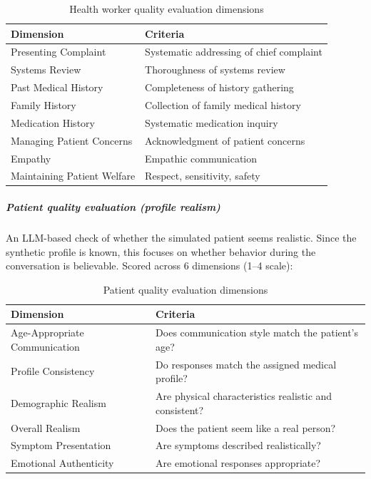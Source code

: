 \begin{table}[h]
\centering
\begin{tabular}{|l|p{8cm}|}
\hline
\textbf{Dimension} & \textbf{Criteria} \\
\hline
Presenting Complaint & Systematic addressing of chief complaint \\
Systems Review & Thoroughness of systems review \\
Past Medical History & Completeness of history gathering \\
Family History & Collection of family medical history \\
Medication History & Systematic medication inquiry \\
Managing Patient Concerns & Acknowledgment of patient concerns \\
Empathy & Empathic communication \\
Maintaining Patient Welfare & Respect, sensitivity, safety \\
\hline
\end{tabular}
\caption{Health worker quality evaluation dimensions}
\end{table}

\subparagraph{Patient quality evaluation (profile realism)}
An LLM-based check of whether the simulated patient seems realistic. Since the synthetic profile is known, this focuses on whether behavior during the conversation is believable. Scored across 6 dimensions (1--4 scale):

\begin{table}[h]
\centering
\begin{tabular}{|l|p{8cm}|}
\hline
\textbf{Dimension} & \textbf{Criteria} \\
\hline
Age-Appropriate Communication & Does communication style match the patient's age? \\
Profile Consistency & Do responses match the assigned medical profile? \\
Demographic Realism & Are physical characteristics realistic and consistent? \\
Overall Realism & Does the patient seem like a real person? \\
Symptom Presentation & Are symptoms described realistically? \\
Emotional Authenticity & Are emotional responses appropriate? \\
\hline
\end{tabular}
\caption{Patient quality evaluation dimensions}
\end{table}

